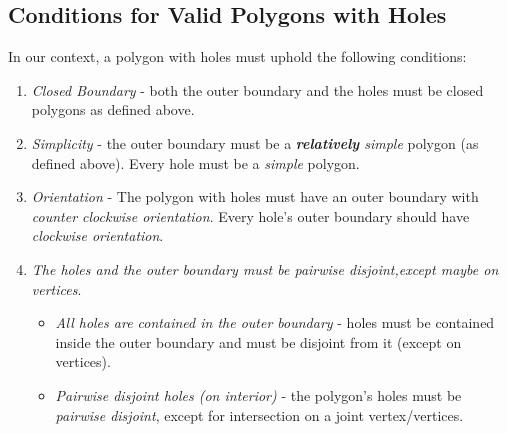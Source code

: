 \subsection{Conditions for Valid Polygons with Holes \label{bso_ssec:polygon_with_holes_validation}}
In our context, a polygon with holes must uphold the following conditions:\\
\begin{enumerate}
\item \textit{Closed Boundary} - both the outer boundary and the holes must be closed polygons as defined above.
\item \textit{Simplicity} - the outer boundary must be a \textit{\textbf{relatively} simple} polygon (as defined above). Every hole must be a \textit{simple} polygon. 
\item \textit{Orientation} - The polygon with holes must have an outer boundary with  \textit{counter clockwise orientation}. Every hole's outer boundary should have  \textit{clockwise orientation}. 
\item \textit{The holes and the outer boundary must be pairwise disjoint,except maybe on vertices}. 
\begin{itemize}
\item \textit{All holes are contained in the outer boundary} - holes must be contained inside the outer boundary and must be disjoint from it (except on vertices). 
\item \textit{Pairwise disjoint holes (on interior)} - the polygon's holes must be \textit{pairwise disjoint}, except for intersection on a joint vertex/vertices. 

\end{itemize}
\end{enumerate}


